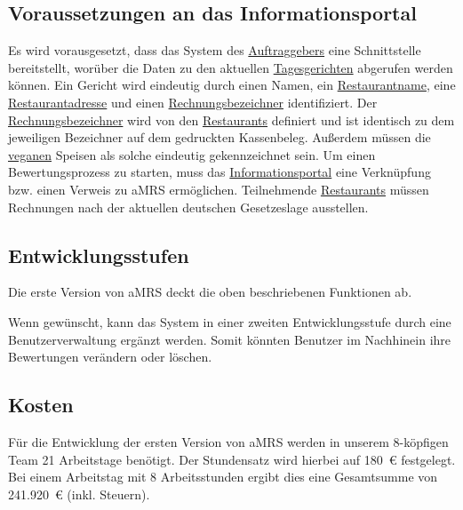 \subsection{Voraussetzungen an das Informationsportal}
Es wird vorausgesetzt, dass das System des \hyperref[gls:auftraggeber]{Auftraggebers} eine Schnittstelle bereitstellt, worüber die Daten zu den aktuellen \hyperref[gls:tagesgericht]{Tagesgerichten} abgerufen werden können.
Ein Gericht wird eindeutig durch einen Namen, ein \hyperref[gls:restaurantname]{Restaurantname}, eine \hyperref[gls:restaurantAdresse]{Restaurantadresse} und einen \hyperref[gls:Rechnungsbezeichner]{Rechnungsbezeichner} identifiziert.
Der \hyperref[gls:Rechnungsbezeichner]{Rechnungsbezeichner} wird von den \hyperref[gls:restaurant]{Restaurants} definiert und ist identisch zu dem jeweiligen Bezeichner auf dem gedruckten Kassenbeleg.
Außerdem müssen die \hyperref[gls:vegan]{veganen} Speisen als solche eindeutig gekennzeichnet sein.
\newparagraph
Um einen Bewertungsprozess zu starten, muss das \hyperref[gls:informationsportal]{Informationsportal} eine Verknüpfung bzw. einen Verweis zu \ac{aMRS} ermöglichen.
Teilnehmende \hyperref[gls:restaurant]{Restaurants} müssen Rechnungen nach der aktuellen deutschen Gesetzeslage ausstellen.

\subsection{Entwicklungsstufen}

\noindent Die erste Version von \ac{aMRS} deckt die oben beschriebenen Funktionen ab. \newline

\noindent Wenn gewünscht, kann das System in einer zweiten Entwicklungsstufe durch eine Benutzerverwaltung ergänzt werden.
Somit könnten Benutzer im Nachhinein ihre Bewertungen verändern oder löschen.

\subsection{Kosten}


Für die Entwicklung der ersten Version von \ac{aMRS} werden in unserem 8-köpfigen Team 21 Arbeitstage benötigt.
Der Stundensatz wird hierbei auf 180~\euro{} festgelegt.
Bei einem Arbeitstag mit 8 Arbeitsstunden ergibt dies eine Gesamtsumme von 241.920~\euro{} (inkl. Steuern).


